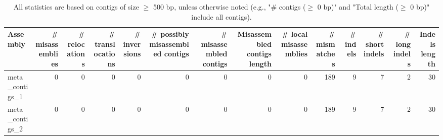 \documentclass[12pt,a4paper]{article}
\begin{document}
\begin{table}[ht]
\begin{center}
\caption{All statistics are based on contigs of size $\geq$ 500 bp, unless otherwise noted (e.g., "\# contigs ($\geq$ 0 bp)" and "Total length ($\geq$ 0 bp)" include all contigs).}
\begin{tabular}{|l*{13}{|r}|}
\hline
Assembly & \# misassemblies &     \# relocations &     \# translocations &     \# inversions & \# possibly misassembled contigs & \# misassembled contigs & Misassembled contigs length & \# local misassemblies & \# mismatches & \# indels &     \# short indels &     \# long indels & Indels length \\ \hline
meta\_contigs\_1 & 0 & 0 & 0 & 0 & 0 & 0 & 0 & 0 & 189 & 9 & 7 & 2 & 30 \\ \hline
meta\_contigs\_2 & 0 & 0 & 0 & 0 & 0 & 0 & 0 & 0 & 189 & 9 & 7 & 2 & 30 \\ \hline
\end{tabular}
\end{center}
\end{table}
\end{document}
